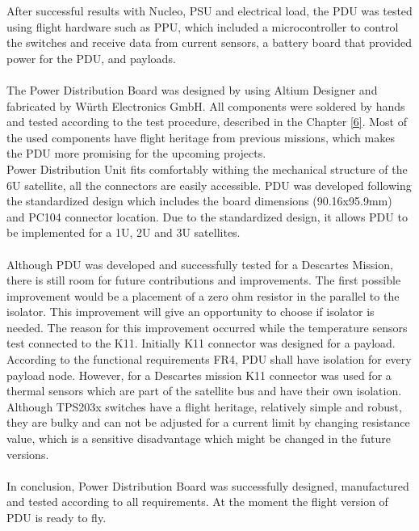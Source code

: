 After successful results with Nucleo, PSU and electrical load, the PDU was tested using flight hardware such as PPU, which included a microcontroller to control the switches and receive data from current sensors, a battery board that provided power for the PDU, and payloads. 
\\ \\
The Power Distribution Board was designed by using Altium Designer and fabricated by Würth Electronics GmbH. All components were soldered by hands and tested according to the test procedure, described in the Chapter \ref{6}. Most of the used components have flight heritage from previous missions, which makes the PDU more promising for the upcoming projects.  \\ 
Power Distribution Unit fits comfortably withing the mechanical structure of the 6U satellite, all the connectors are easily accessible.
PDU was developed following the standardized design which includes the board dimensions (90.16x95.9mm) and PC104 connector location.
Due to the standardized design, it allows PDU to be implemented for a 1U, 2U and 3U satellites. \\ \\
Although PDU was developed and successfully tested for a Descartes Mission, there is still room for future contributions and improvements. The first possible improvement would be a placement of a zero ohm resistor in the parallel to the isolator. This improvement will give an opportunity to choose if isolator is needed. The reason for this improvement occurred while the temperature sensors test connected to the K11. Initially K11 connector was designed for a payload. According to the functional requirements FR4, PDU shall have isolation for every payload node. However, for a Descartes mission K11 connector was used for a thermal sensors which are part of the satellite bus and have their own isolation. Although TPS203x switches have a flight heritage, relatively simple and robust, they are bulky and can not be adjusted for a current limit by changing resistance value, which is a sensitive disadvantage which might be changed in the future versions.  \\ \\
In conclusion, Power Distribution Board was successfully designed,  manufactured and tested according to all requirements. At the moment the flight version of PDU is ready to fly. 
